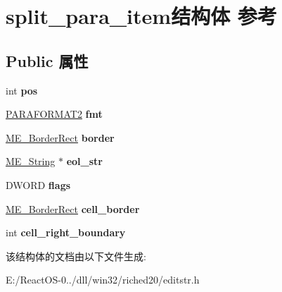 \hypertarget{structsplit__para__item}{}\section{split\+\_\+para\+\_\+item结构体 参考}
\label{structsplit__para__item}
\subsection*{Public 属性}
\begin{DoxyCompactItemize}
\item 
\mbox{\label{structsplit__para__item_aea7b975aa7c2fa3c5ca88ba7ba05c210}} 
int {\bfseries pos}
\item 
\mbox{\label{structsplit__para__item_ae8a20e158f5258c57067f5a85a24f5c2}} 
\hyperlink{struct__paraformat2}{P\+A\+R\+A\+F\+O\+R\+M\+A\+T2} {\bfseries fmt}
\item 
\mbox{\label{structsplit__para__item_aaeaeaf9a2d8efcc8695591712fd925b4}} 
\hyperlink{structtag_m_e___border_rect}{M\+E\+\_\+\+Border\+Rect} {\bfseries border}
\item 
\mbox{\label{structsplit__para__item_a33d6f93d085fbfd5dcd29b62c60ee579}} 
\hyperlink{structtag_m_e___string}{M\+E\+\_\+\+String} $\ast$ {\bfseries eol\+\_\+str}
\item 
\mbox{\label{structsplit__para__item_afff2f1473e79e67e9e9ef40c99873fcd}} 
D\+W\+O\+RD {\bfseries flags}
\item 
\mbox{\label{structsplit__para__item_a60d6fe4aaf7e241f2dfe1bac0276084f}} 
\hyperlink{structtag_m_e___border_rect}{M\+E\+\_\+\+Border\+Rect} {\bfseries cell\+\_\+border}
\item 
\mbox{\label{structsplit__para__item_a02d1e2ab4cee49a98e24e353c0869cc3}} 
int {\bfseries cell\+\_\+right\+\_\+boundary}
\end{DoxyCompactItemize}


该结构体的文档由以下文件生成\+:\begin{DoxyCompactItemize}
\item 
E\+:/\+React\+O\+S-\/0../dll/win32/riched20/editstr.\+h\end{DoxyCompactItemize}
